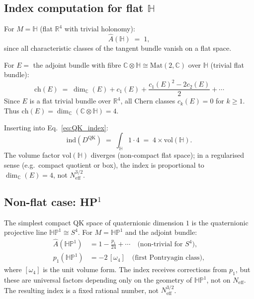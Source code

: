 \documentclass[11pt,a4paper]{article}
\theoremstyle{definition}
\theoremstyle{remark}
\begin{document}
\subsection{Index computation for flat $\mathbb{H}$}

For $M = \mathbb{H}$ (flat $\mathbb{R}^4$ with trivial holonomy):
\begin{equation}
  \hat{A}(\mathbb{H}) \;=\; 1,
  \label{eq:A_hat_flat}
\end{equation}
since all characteristic classes of the tangent bundle vanish on a flat space.

For $E = $ the adjoint bundle with fibre $\mathbb{C}\otimes\mathbb{H}
\cong \mathrm{Mat}(2,\mathbb{C})$ over $\mathbb{H}$ (trivial flat bundle):
\begin{equation}
  \mathrm{ch}(E)
  \;=\; \dim_\mathbb{C}(E) + c_1(E) + \frac{c_1(E)^2 - 2c_2(E)}{2} + \cdots
  \label{eq:ch_E}
\end{equation}
Since $E$ is a flat trivial bundle over $\mathbb{R}^4$, all Chern classes
$c_k(E) = 0$ for $k \geq 1$.
Thus $\mathrm{ch}(E) = \dim_\mathbb{C}(\mathbb{C}\otimes\mathbb{H}) = 4$.

Inserting into Eq.~\eqref{eq:QK_index}:
\begin{equation}
  \mathrm{ind}(D^{\mathrm{QK}})
  \;=\; \int_{\mathbb{H}} 1 \cdot 4
  \;=\; 4 \times \mathrm{vol}(\mathbb{H}).
  \label{eq:ind_QK_H}
\end{equation}
The volume factor $\mathrm{vol}(\mathbb{H})$ diverges (non-compact flat space);
in a regularised sense (e.g.\ compact quotient or box), the index is
proportional to $\dim_\mathbb{C}(E) = 4$, not $N_{\mathrm{eff}}^{3/2}$.

\subsection{Non-flat case: HP$^1$}

The simplest compact QK space of quaternionic dimension $1$ is the
quaternionic projective line $\mathbb{HP}^1 \cong S^4$.
For $M = \mathbb{HP}^1$ and the adjoint bundle:
\begin{align}
  \hat{A}(\mathbb{HP}^1) &= 1 - \frac{p_1}{24} + \cdots \quad
    \text{(non-trivial for $S^4$)}, \\
  p_1(\mathbb{HP}^1) &= -2\,[\omega_4] \quad \text{(first Pontryagin class)},
  \label{eq:hp1_pontryagin}
\end{align}
where $[\omega_4]$ is the unit volume form.
The index receives corrections from $p_1$, but these are universal factors
depending only on the geometry of $\mathbb{HP}^1$, not on $N_{\mathrm{eff}}$.
The resulting index is a fixed rational number, not $N_{\mathrm{eff}}^{3/2}$.
\end{document}
